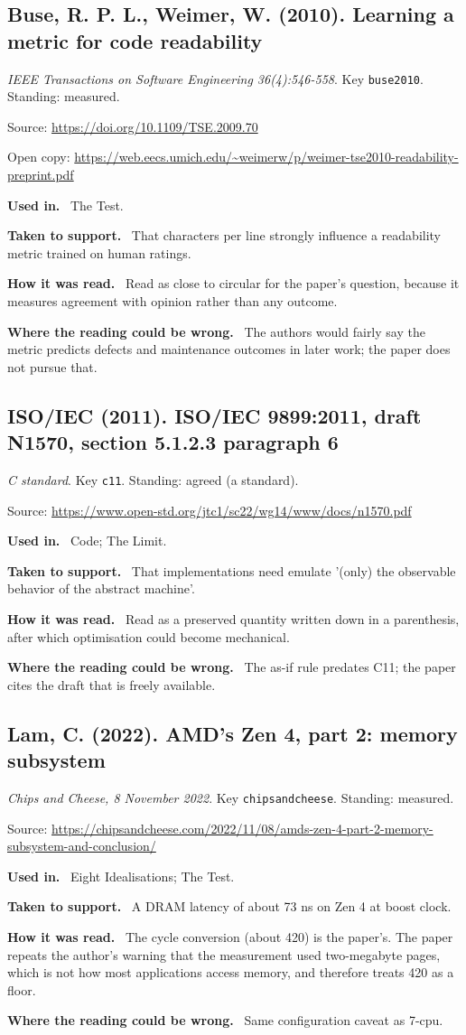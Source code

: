 \documentclass[11pt,oneside]{article}
\newcommand{\field}[1]{\par\noindent\textbf{\color{accent}#1.}\ }
\begin{document}
\hypertarget{src:buse2010}{}
\subsection*{Buse, R. P. L., Weimer, W. (2010). Learning a metric for code readability}
\noindent\small\emph{IEEE Transactions on Software Engineering 36(4):546-558}. Key \texttt{buse2010}. Standing: measured.
\par\noindent\small Source: \url{https://doi.org/10.1109/TSE.2009.70}
\par\noindent\small Open copy: \url{https://web.eecs.umich.edu/~weimerw/p/weimer-tse2010-readability-preprint.pdf}
\normalsize
\field{Used in} The Test.
\field{Taken to support} That characters per line strongly influence a readability metric trained on human ratings.
\field{How it was read} Read as close to circular for the paper's question, because it measures agreement with opinion rather than any outcome.
\field{Where the reading could be wrong} The authors would fairly say the metric predicts defects and maintenance outcomes in later work; the paper does not pursue that.

\hypertarget{src:c11}{}
\subsection*{ISO/IEC (2011). ISO/IEC 9899:2011, draft N1570, section 5.1.2.3 paragraph 6}
\noindent\small\emph{C standard}. Key \texttt{c11}. Standing: agreed (a standard).
\par\noindent\small Source: \url{https://www.open-std.org/jtc1/sc22/wg14/www/docs/n1570.pdf}
\normalsize
\field{Used in} Code; The Limit.
\field{Taken to support} That implementations need emulate '(only) the observable behavior of the abstract machine'.
\field{How it was read} Read as a preserved quantity written down in a parenthesis, after which optimisation could become mechanical.
\field{Where the reading could be wrong} The as-if rule predates C11; the paper cites the draft that is freely available.

\hypertarget{src:chipsandcheese}{}
\subsection*{Lam, C. (2022). AMD's Zen 4, part 2: memory subsystem}
\noindent\small\emph{Chips and Cheese, 8 November 2022}. Key \texttt{chipsandcheese}. Standing: measured.
\par\noindent\small Source: \url{https://chipsandcheese.com/2022/11/08/amds-zen-4-part-2-memory-subsystem-and-conclusion/}
\normalsize
\field{Used in} Eight Idealisations; The Test.
\field{Taken to support} A DRAM latency of about 73 ns on Zen 4 at boost clock.
\field{How it was read} The cycle conversion (about 420) is the paper's. The paper repeats the author's warning that the measurement used two-megabyte pages, which is not how most applications access memory, and therefore treats 420 as a floor.
\field{Where the reading could be wrong} Same configuration caveat as 7-cpu.
\end{document}
